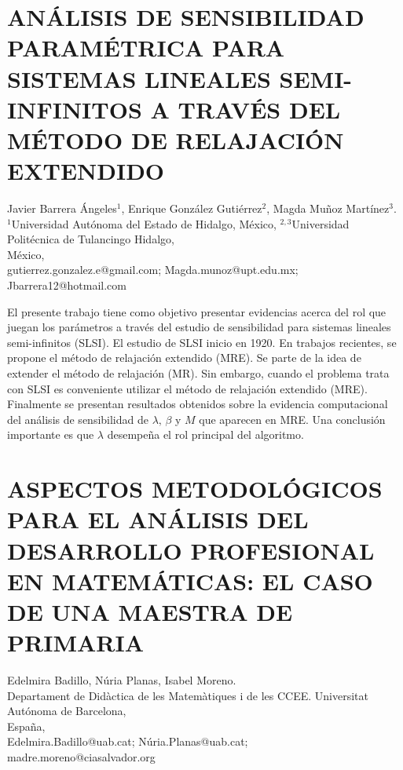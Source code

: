 \section{\uppercase{ Análisis DE SENSIBILIDAD PARAMÉTRICA para SISTEMAS LINEALES
SEMI-INFINITOS A TRAVÉS del método de relajación EXTENDIDO}}

\begin{datos}
Javier Barrera Ángeles$^ 1$, Enrique González Gutiérrez$^2$, Magda Muñoz Martínez$^3$.\\
$^1$Universidad Autónoma del Estado de Hidalgo, México, $^{2,3}$Universidad Politécnica de Tulancingo Hidalgo,\\
\hfill México, \\
\hfill gutierrez.gonzalez.e@gmail.com; Magda.munoz@upt.edu.mx;\\\hfill  Jbarrera12@hotmail.com
\end{datos}

El presente trabajo tiene como objetivo presentar evidencias acerca
del rol que juegan los parámetros a través del estudio de sensibilidad
para sistemas lineales semi-infinitos (SLSI). El estudio de SLSI inicio
en 1920. En trabajos recientes, se propone el método de relajación
extendido (MRE). Se parte de la idea de extender el método de relajación
(MR). Sin embargo, cuando el problema trata con SLSI es conveniente
utilizar el método de relajación extendido (MRE). Finalmente se presentan
resultados obtenidos sobre la evidencia computacional del análisis
de sensibilidad de $\lambda,\,\beta$ y $M$ que aparecen en MRE.
Una conclusión importante es que $\lambda$ desempeña el rol principal
del algoritmo.


\section{ASPECTOS METODOLÓGICOS PARA EL ANÁLISIS DEL DESARROLLO PROFESIONAL
EN MATEMÁTICAS: EL CASO DE UNA MAESTRA DE PRIMARIA}

\begin{datos}
Edelmira Badillo, Núria Planas, Isabel Moreno.\\
Departament de Didàctica de les Matemàtiques i de les CCEE. Universitat Autónoma de Barcelona,\\
\hfill España, \\
\hfill Edelmira.Badillo@uab.cat; Núria.Planas@uab.cat; \\\hfill  madre.moreno@ciasalvador.org
\end{datos}


